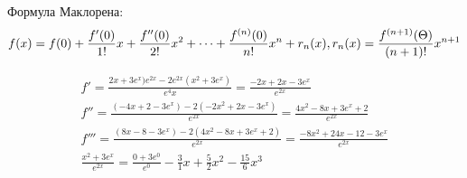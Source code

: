 \documentclass[../rgr1.tex]{subfiles}
\begin{document}

	Формула Маклорена:
\begin{dmath}
	f(x) = f(0) + \frac{f'(0)}{1!}x + \frac{f''(0)}{2!}x^2 +\cdots+
	\frac{f^{(n)}(0)}{n!}x^n + r_n(x), \\
	r_n(x) = \frac{f^{(n+1)}(\Theta)}{(n+1)!}x^{n+1}
	\label{maclaurin}
\end{dmath}

\Solution

\begin{align}
	f' = \frac{2x+3e^x)e^{2x} - 2e^{2x}(x^2+3e^x)}{e^4x}
	= \frac{-2x+2x-3e^x}{e^{2x}} \\
	f'' = \frac{(-4x+2-3e^x)-2(-2x^2+2x-3e^x)}{e^{2x}}
	= \frac{4x^2 - 8x + 3e^x + 2}{e^{2x}}\\
	f''' = \frac{(8x-8-3e^x)-2(4x^2-8x+3e^x+2)}{e^{2x}}
	= \frac{-8x^2+24x-12-3e^x}{e^{2x}} \\
	\frac{x^2+3e^x}{e^{2x}}
	= \frac{0 + 3e^0}{e^0}
	-\frac{3}{1}x + \frac{5}{2}x^2 -\frac{15}{6}x^3
\end{align}

\end{document}
